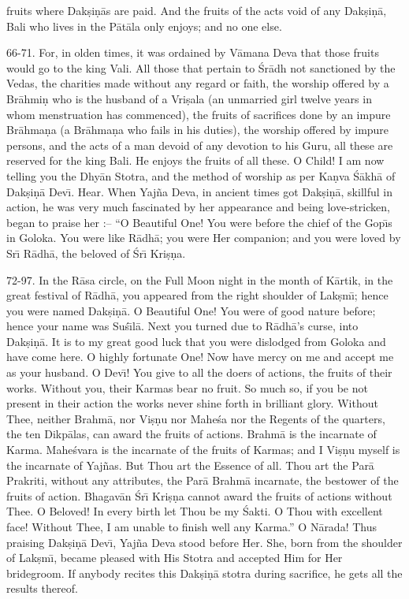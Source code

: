 fruits where Dak\d{s}i\d{n}\=as are paid. And the fruits of the acts void of any Dak\d{s}i\d{n}\=a, Bali who lives in the P\=at\=ala only enjoys; and no one else.

66-71. For, in olden times, it was ordained by V\=amana Deva that those fruits would go to the king Vali. All those that pertain to \'Sr\=adh not sanctioned by the Vedas, the charities made without any regard or faith, the worship offered by a Br\=ahmi\d{n} who is the husband of a Vri\d{s}ala (an unmarried girl twelve years in whom menstruation has commenced), the fruits of sacrifices done by an impure Br\=ahma\d{n}a (a Br\=ahma\d{n}a who fails in his duties), the worship offered by impure persons, and the acts of a man devoid of any devotion to his Guru, all these are reserved for the king Bali. He enjoys the fruits of all these. O Child! I am now telling you the Dhy\=an Stotra, and the method of worship as per Ka\d{n}va \'S\=akh\=a of Dak\d{s}i\d{n}\=a Dev\={\i}. Hear. When Yaj\~na Deva, in ancient times got Dak\d{s}i\d{n}\=a, skillful in action, he was very much fascinated by her appearance and being love-stricken, began to praise her :-- ``O Beautiful One! You were before the chief of the Gop\={\i}s in Goloka. You were like R\=adh\=a; you were Her companion; and you were loved by Sr\={\i} R\=adh\=a, the beloved of \'Sr\={\i} Kri\d{s}\d{n}a.

72-97. In the R\=asa circle, on the Full Moon night in the month of K\=artik, in the great festival of R\=adh\=a, you appeared from the right shoulder of Lak\d{s}m\={\i}; hence you were named Dak\d{s}i\d{n}\=a. O Beautiful One! You were of good nature before; hence your name was Su\'s\={\i}l\=a. Next you turned due to R\=adh\=a's curse, into Dak\d{s}i\d{n}\=a. It is to my great good luck that you were dislodged from Goloka and have come here. O highly fortunate One! Now have mercy on me and accept me as your husband. O Dev\={\i}! You give to all the doers of actions, the fruits of their works. Without you, their Karmas bear no fruit. So much so, if you be not present in their action the works never shine forth in brilliant glory. Without Thee, neither Brahm\=a, nor Vi\d{s}\d{n}u nor Mahe\'sa nor the Regents of the quarters, the ten Dikp\=alas, can award the fruits of actions. Brahm\=a is the incarnate of Karma. Mahe\'svara is the incarnate of the fruits of Karmas; and I Vi\d{s}\d{n}u myself is the incarnate of Yaj\~nas. But Thou art the Essence of all. Thou art the Par\=a Prakriti, without any attributes, the Par\=a Brahm\=a incarnate, the bestower of the fruits of action. Bhagav\=an \'Sr\={\i} Kri\d{s}\d{n}a cannot award the fruits of actions without Thee. O Beloved! In every birth let Thou be my \'Sakti. O Thou with excellent face! Without Thee, I am unable to finish well any Karma.'' O N\=arada! Thus praising Dak\d{s}i\d{n}\=a Dev\={\i}, Yaj\~na Deva stood before Her. She, born from the shoulder of Lak\d{s}m\={\i}, became pleased with His Stotra and accepted Him for Her bridegroom. If anybody recites this Dak\d{s}i\d{n}\=a stotra during sacrifice, he gets all the results thereof.

